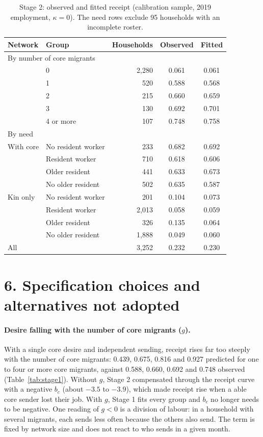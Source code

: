 \documentclass[11pt]{article}
\begin{document}
\begin{table}[ht]
\centering
\caption{Stage 2: observed and fitted receipt (calibration sample, 2019 employment, $\kappa = 0$). The need rows exclude 95 households with an incomplete roster.}
\label{tab:stage2fit}
\begin{tabular}{llrcc}
\toprule
Network & Group & Households & Observed & Fitted \\
\midrule
\multicolumn{2}{l}{By number of core migrants} & & & \\
& 0 & 2,280 & 0.061 & 0.061 \\
& 1 & 520 & 0.588 & 0.568 \\
& 2 & 215 & 0.660 & 0.659 \\
& 3 & 130 & 0.692 & 0.701 \\
& 4 or more & 107 & 0.748 & 0.758 \\
\midrule
\multicolumn{2}{l}{By need} & & & \\
With core & No resident worker & 233 & 0.682 & 0.692 \\
 & Resident worker & 710 & 0.618 & 0.606 \\
 & Older resident & 441 & 0.633 & 0.673 \\
 & No older resident & 502 & 0.635 & 0.587 \\
Kin only & No resident worker & 201 & 0.104 & 0.073 \\
 & Resident worker & 2,013 & 0.058 & 0.059 \\
 & Older resident & 326 & 0.135 & 0.064 \\
 & No older resident & 1,888 & 0.049 & 0.060 \\
\midrule
All & & 3,252 & 0.232 & 0.230 \\
\bottomrule
\end{tabular}
\end{table}

\section*{6. Specification choices and alternatives not adopted}

\paragraph{Desire falling with the number of core migrants ($g$).} With a single core desire and independent sending, receipt rises far too steeply with the number of core migrants: 0.439, 0.675, 0.816 and 0.927 predicted for one to four or more core migrants, against 0.588, 0.660, 0.692 and 0.748 observed (Table~\ref{tab:stage1}). Without $g$, Stage 2 compensated through the receipt curve with a negative $b_c$ (about $-3.5$ to $-3.9$), which made receipt rise when a able core sender lost their job. With $g$, Stage 1 fits every group and $b_c$ no longer needs to be negative. One reading of $g < 0$ is a division of labour: in a household with several migrants, each sends less often because the others also send. The term is fixed by network size and does not react to who sends in a given month.
\end{document}
